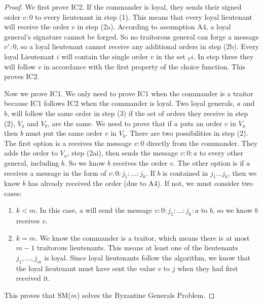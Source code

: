 \documentclass[10pt]{amsart}
\begin{document}
\begin{proof}
    We first prove IC2. If the commander is loyal, they sends their signed order $v:0$ to every lieutenant
    in step (1). This means that every loyal lieutenant will receive the order $v$ in step (2a). According
    to assumption A4, a loyal general's signature cannot be forged. So no traitorous general can
    forge a message $v':0$, so a loyal lieutenant cannot receive any additional orders in step (2b). 
    Every loyal Lieutenant $i$ will contain the single order $v$ in the set $_Vi$. In step three they will
    follow $v$ in accordance with the first property of the choice function. This proves IC2.

    Now we prove IC1. We only need to prove IC1 when the commander is a traitor because IC1 follows
    IC2 when the commander is loyal. Two loyal generals, $a$ and $b$, will follow the same order in step (3) if the
    set of orders they receive in step (2), $V_a$ and $V_b$, are the same. We need to prove that if $a$ puts an order $v$
    in $V_a$ then $b$ must put the same order $v$ in $V_b$. There are two possibilities in step (2). The first
    option is a receives the message $v:0$ directly from the commander. They adds the order to $V_a$, step (2ai),
    then sends the message $v:0:a$ to every other general, including $b$. So we know $b$ receives the order $v$.
    The other option is if $a$ receives a message in the form of $v:0:j_1:...:j_k$. If $b$ is contained in
    $j_1...j_k$, then we know $b$ has already received the order (due to A4). If not, we must consider two
    cases:
    \begin{enumerate}[label=\arabic{enumi}.]
        \item $k<m$. In this case, a will send the message $v:0:j_1:...:j_k:a$ to $b$, so we know $b$ receives $v$.
        \item {
            $k = m$. We know the commander is a traitor, which means there is at most $m - 1$ traitorous
            lieutenants. This means at least one of the lieutenants $j_1,...,j_m$ is loyal. Since
            loyal lieutenants follow the algorithm, we know that the loyal lieutenant must have sent
            the value $v$ to $j$ when they had first received it.
        }
    \end{enumerate}
    This proves that SM($m$) solves the Byzantine Generals Problem.
\end{proof}

\end{document}
